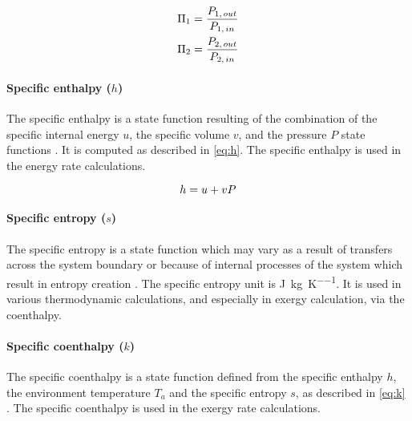 \begin{subequations}
  \label{eq:PR}
  \begin{align}
  \Pi_1 = \dfrac{P_{1,\,out}}{P_{1,\,in}}
  \tagaddtexttwo{$\left[-\right]$} \\
  \Pi_2 = \dfrac{P_{2,\,out}}{P_{2,\,in}}
  \tagaddtexttwo{$\left[-\right]$}
  \end{align}
\end{subequations}



\paragraph{Specific enthalpy ($h$)}

The specific enthalpy is a state function resulting of the combination
of the specific internal energy $u$, the specific volume $v$, and the
pressure $P$ state functions \citep[p.\,19]{Borel-Favrat-2010a}. It is
computed as described in \cref{eq:h}. The specific enthalpy is used in
the energy rate calculations.

\begin{equation}
  \label{eq:h}
  h = u + vP
  \tagaddtextone{$\left[\si{\joule\per\kilo\gram}\right]$}
\end{equation}

\paragraph{Specific entropy ($s$)}
The specific entropy is a state function which may vary as a result of
transfers across the system boundary or because of internal processes
of the system which result in entropy creation
\citep[p.\,37]{Borel-Favrat-2010a}. The specific entropy unit is
\si{\joule\per\kilo\gram\per\kelvin}. It is used in various
thermodynamic calculations, and especially in exergy calculation, via
the coenthalpy.


\paragraph{Specific coenthalpy ($k$)}
The specific coenthalpy is a state function defined from the specific
enthalpy $h$, the environment temperature $T_a$ and the specific
entropy $s$, as described in \cref{eq:k}
\citep[p.\,410]{Borel-Favrat-2010a}. The specific coenthalpy is used in
the exergy rate calculations.


